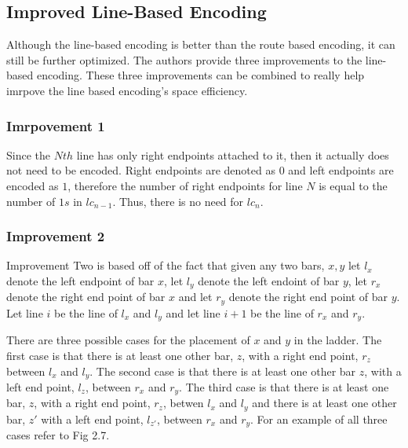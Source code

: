 \subsection{Improved Line-Based Encoding}
Although the line-based encoding is better than the route based 
encoding, it can still be further optimized. The authors provide 
three improvements to the line-based encoding. These three improvements
can be combined to really help imrpove the line based encoding's 
space efficiency. 
\subsubsection{Imrpovement 1}
Since the $Nth$ line has only right endpoints attached to it, 
then it actually does not need to be encoded. Right endpoints 
are denoted as $0$ and left endpoints are encoded as $1$, therefore the number of right endpoints 
for line $N$ is equal to the number of $1s$ in $lc_{n-1}$.
Thus, there is no need for $lc_{n}$.
\subsubsection{Improvement 2}
Improvement Two is based off of the fact that given any two bars,
$x,y$ let $l_{x}$ denote the left endpoint of bar $x$, let 
$l_{y}$ denote the left endoint of bar $y$, let $r_{x}$ denote 
the right end point of bar $x$ and let $r_{y}$ denote the right 
end point of bar $y$. Let line $i$ be the line of $l_{x}$ and $l_{y}$
and let line $i+1$ be the line of $r_{x}$ and $r_{y}$.
\begin{theorem}
There are three possible cases for the 
placement of $x$ and $y$ in the ladder. The first case is that there 
is at least one other bar, $z$, with a right end point, $r_{z}$ between $l_{x}$
and $l_{y}$. The second case is that there is at least one other bar 
$z$, with a left end point, $l_{z}$, between $r_{x}$ and $r_{y}$. The third case 
is that there is at least one bar, $z$, with a right end point, 
$r_{z}$, betwen $l_{x}$ and $l_{y}$ and there is at least one other bar, 
$z\prime$ with a left end point, $l_{z\prime}$, between $r_{x}$ and $r_{y}$. For an example of all 
three cases refer to Fig 2.7.\par
\end{theorem}

